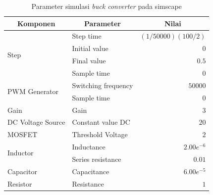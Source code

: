 \documentclass[../main.tex]{subfiles}
\begin{document}
            \begin{table}[H]
            \centering
            \caption{Parameter simulasi \textit{buck converter} pada simscape}
            \vspace{0.5cm}
            \label{parameter_simulasi}
            \begin{tabular}{|l|l|r|}
            \hline
            \multicolumn{1}{|c|}{\textbf{Komponen}} & \multicolumn{1}{c|}{\textbf{Parameter}}                     & \multicolumn{1}{c|}{\textbf{Nilai}} \\ \hline
            \multirow{4}{*}{Step}          & Step time                                                            & $(1/50000)(100/2)$         \\ \cline{2-3} 
                                           & Initial value                                                        & $0$                        \\ \cline{2-3} 
                                           & Final value                                                          & $0.5$                      \\ \cline{2-3} 
                                           & Sample time                                                          & $0$                        \\ \hline
            \multirow{2}{*}{PWM Generator} & Switching frequency                                                  & $50000$                    \\ \cline{2-3} 
                                           & Sample time                                                          & $0$                        \\ \hline
            Gain                           & Gain                                                                 & $3$                        \\ \hline
            DC Voltage Source              & Constant value DC                                                    & $20$                       \\ \hline
            MOSFET                         & Threshold Voltage                                                    & $2$                        \\ \hline
            \multirow{2}{*}{Inductor}      & Inductance                                                           & $2.00e^{-6}$                  \\ \cline{2-3} 
                                           & Series resistance                                                    & $0.01$                     \\ \hline
            Capacitor                      & Capacitance                                                          & $6.00e^{-5}$                 \\ \hline
            Resistor                       & Resistance                                                           & $1$                        \\ \hline
            \end{tabular}
            \end{table}
\end{document}
